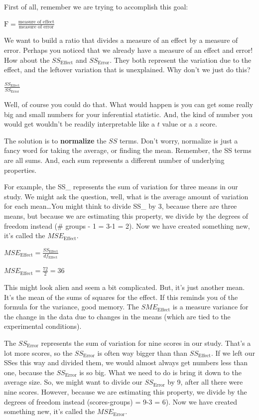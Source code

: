 \documentclass[
]{book}
\begin{document}
First of all, remember we are trying to accomplish this goal:

\(\text{F} = \frac{\text{measure of effect}}{\text{measure of error}}\)

We want to build a ratio that divides a measure of an effect by a measure of error. Perhaps you noticed that we already have a measure of an effect and error! How about the \(SS_\text{Effect}\) and \(SS_\text{Error}\). They both represent the variation due to the effect, and the leftover variation that is unexplained. Why don't we just do this?

\(\frac{SS_\text{Effect}}{SS_\text{Error}}\)

Well, of course you could do that. What would happen is you can get some really big and small numbers for your inferential statistic. And, the kind of number you would get wouldn't be readily interpretable like a \(t\) value or a \(z\) score.

The solution is to \textbf{normalize} the \(SS\) terms. Don't worry, normalize is just a fancy word for taking the average, or finding the mean. Remember, the SS terms are all sums. And, each sum represents a different number of underlying properties.

For example, the SS\_ represents the sum of variation for three means in our study. We might ask the question, well, what is the average amount of variation for each mean\ldots You might think to divide SS\_ by 3, because there are three means, but because we are estimating this property, we divide by the degrees of freedom instead (\# groups - 1 = 3-1 = 2). Now we have created something new, it's called the \(MSE_\text{Effect}\).

\(MSE_\text{Effect} = \frac{SS_\text{Effect}}{df_\text{Effect}}\)

\(MSE_\text{Effect} = \frac{72}{2} = 36\)

This might look alien and seem a bit complicated. But, it's just another mean. It's the mean of the sums of squares for the effect. If this reminds you of the formula for the variance, good memory. The \(SME_\text{Effect}\) is a measure variance for the change in the data due to changes in the means (which are tied to the experimental conditions).

The \(SS_\text{Error}\) represents the sum of variation for nine scores in our study. That's a lot more scores, so the \(SS_\text{Error}\) is often way bigger than than \(SS_\text{Effect}\). If we left our SSes this way and divided them, we would almost always get numbers less than one, because the \(SS_\text{Error}\) is so big. What we need to do is bring it down to the average size. So, we might want to divide our \(SS_\text{Error}\) by 9, after all there were nine scores. However, because we are estimating this property, we divide by the degrees of freedom instead (scores-groups) = 9-3 = 6). Now we have created something new, it's called the \(MSE_\text{Error}\).
\end{document}
